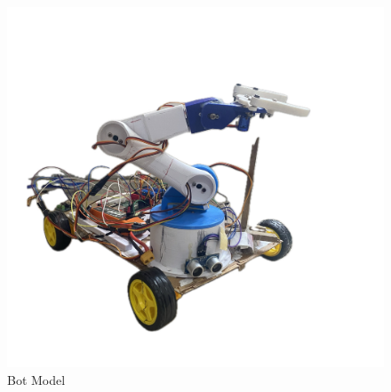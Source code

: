 \begin{figure}[h]
    \centering
    \includegraphics[width=1\linewidth]{Graphics/finalbot.jpg}
    \caption{Bot Model}
    \label{fig:enter-label}
\end{figure}